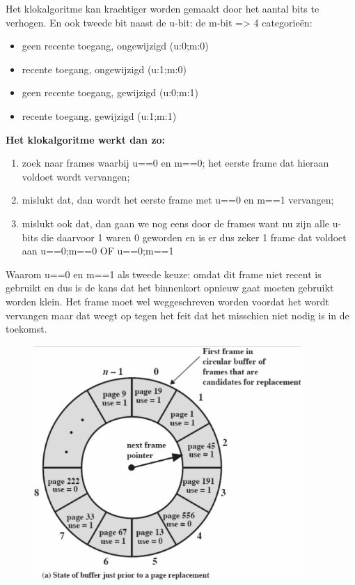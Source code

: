 Het klokalgoritme kan krachtiger worden gemaakt door het aantal bits te verhogen. En ook tweede bit naast de u-bit: de m-bit => 4 categorieën:

\begin{itemize}
\item geen recente toegang, ongewijzigd (u:0;m:0)
\item recente toegang, ongewijzigd (u:1;m:0)
\item geen recente toegang, gewijzigd (u:0;m:1)
\item recente toegang, gewijzigd (u:1;m:1)
\end{itemize}

\textbf{Het klokalgoritme werkt dan zo:}

\begin{enumerate}
\item zoek naar frames waarbij u==0 en m==0; het eerste frame dat hieraan voldoet wordt vervangen;
\item mislukt dat, dan wordt het eerste frame met u==0 en m==1 vervangen;
\item mislukt ook dat, dan gaan we nog eens door de frames want nu zijn alle u-bits die daarvoor 1 waren 0 geworden en is er dus zeker 1 frame dat voldoet aan u==0;m==0 OF u==0;m==1
\end{enumerate}

Waarom u==0 en m==1 als tweede keuze: omdat dit frame niet recent is gebruikt en dus is de kans dat het binnenkort opnieuw gaat moeten gebruikt worden klein. Het frame moet wel weggeschreven worden voordat het wordt vervangen maar dat weegt op tegen het feit dat het misschien niet nodig is in de toekomst.


\begin{figure}[htp]
    \centering
            \includegraphics[width=4in]{img/klok1}
        \caption{}
    \label{fig:}
\end{figure}

